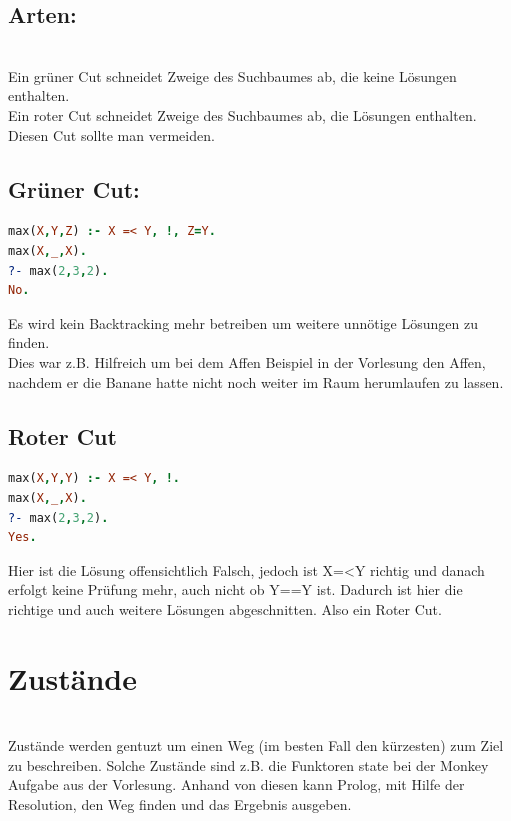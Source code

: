 \subsection{Arten:}\qquad\\
Ein grüner Cut schneidet Zweige des Suchbaumes ab, die keine Lösungen enthalten.\\
Ein roter Cut schneidet Zweige des Suchbaumes ab, die Lösungen enthalten. Diesen Cut sollte man vermeiden.
\subsection{Grüner Cut:}
\begin{lstlisting}[language=Prolog] 
max(X,Y,Z) :- X =< Y, !, Z=Y.
max(X,_,X).
?- max(2,3,2).
No.
\end{lstlisting}
Es wird kein Backtracking mehr betreiben um weitere unnötige Lösungen zu finden. \\
Dies war z.B. Hilfreich um bei dem Affen Beispiel in der Vorlesung den Affen, nachdem er die Banane hatte nicht noch weiter im Raum herumlaufen zu lassen. \\
\newpage
\subsection{Roter Cut}
\begin{lstlisting}[language=Prolog] 
max(X,Y,Y) :- X =< Y, !.
max(X,_,X).
?- max(2,3,2).
Yes.
\end{lstlisting}
Hier ist die Lösung offensichtlich Falsch, jedoch ist X=<Y richtig und danach erfolgt keine Prüfung mehr, auch nicht ob Y==Y ist. Dadurch ist hier die richtige und auch weitere Lösungen abgeschnitten. Also ein Roter Cut.\\

\section{Zustände}\qquad\\
Zustände werden gentuzt um einen Weg (im besten Fall den kürzesten) zum Ziel zu beschreiben. Solche Zustände sind z.B. die Funktoren state bei der Monkey Aufgabe aus der Vorlesung. Anhand von diesen kann Prolog, mit Hilfe der Resolution, den Weg finden und das Ergebnis ausgeben. 